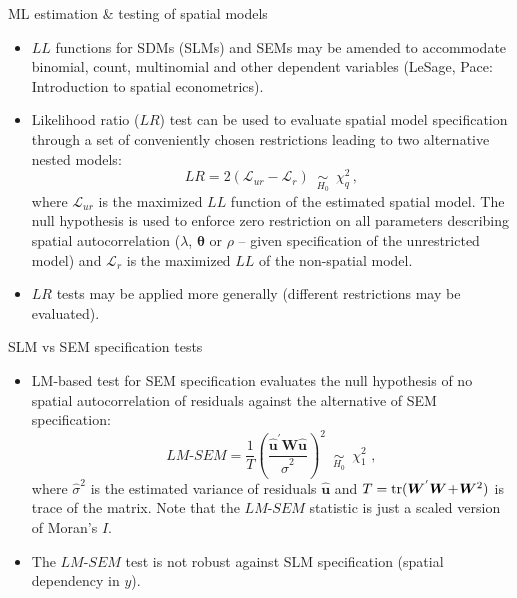 \documentclass{beamer}
\begin{document}
\begin{frame}{ML estimation \& testing of spatial models}
\begin{itemize}
    \item $LL$ functions  for SDMs (SLMs) and SEMs may be amended to accommodate binomial, count, multinomial and other dependent variables (LeSage, Pace: Introduction  to  spatial  econometrics).
    \smallskip
    \item Likelihood ratio ($LR$) test can be used to evaluate spatial model specification through a set of conveniently chosen restrictions leading to two alternative nested models:
\begin{equation*}
\textit{LR} = 2(\mathcal{L}_{ur}-\mathcal{L}_{r}) \,\,\, \underset{H_0}{\sim} \,\,\, \chi_q^2 \, ,
\end{equation*}
where $\mathcal{L}_{ur}$ is the maximized $LL$ function  of the estimated spatial model. The null hypothesis is used to enforce zero restriction on all parameters describing spatial autocorrelation ($\lambda$, $\bm{\theta}$ or $\rho$ -- given specification of the unrestricted model) and $\mathcal{L}_{r}$ is the maximized $LL$ of the non-spatial model.
\smallskip
\item $LR$ tests may be applied more generally (different restrictions may be evaluated).
\end{itemize}
\end{frame}
\begin{frame}{SLM vs SEM specification tests}
\begin{itemize}
    \item LM-based test for SEM specification evaluates the null hypothesis of no spatial autocorrelation of residuals against the alternative of SEM specification: 
\begin{equation*}
\textit{LM-SEM}=\frac{1}{T}
\left(\frac{\bm{\hat{u}}^{'}\bm{W\hat{u}}}{\hat{\sigma}^2}\right)^{2} 
\,\,\, \underset{H_0}{\sim} \,\,\, \chi_1^2 \,\,,
\end{equation*}
where $\hat{\sigma}^2$ is the estimated variance of residuals $\bm{\hat{u}}$ and $T=\textnormal{tr}(\bm{W}^{'}\bm{W} \! + \! \bm{W}^2)$ is trace of the matrix. Note that the $\textit{LM-SEM}$ statistic is just a scaled version of Moran's $I$.
\smallskip
\item The $\textit{LM-SEM}$ test is not robust against SLM specification (spatial dependency in $y$).
\end{itemize}
\end{frame}
\end{document}
